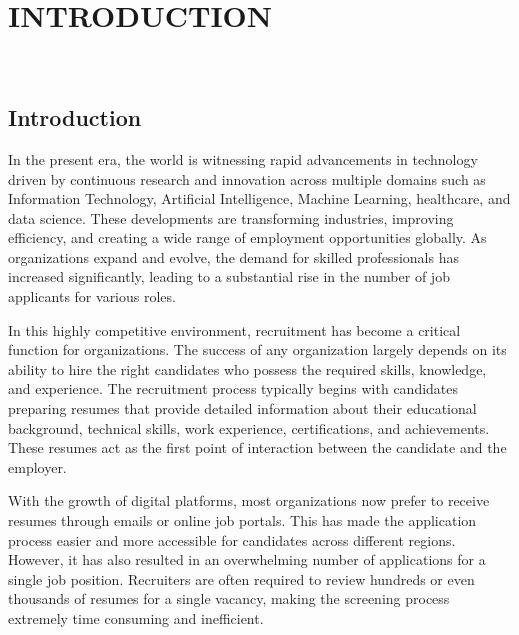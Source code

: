 \chapter{INTRODUCTION}

\patchcmd{\chapter}{\thispagestyle{fancy}}{}{}
 \hrulefill\\

\renewcommand{\thesection}{\thechapter.\arabic{section}}
\doublespacing

\section{Introduction}
{%
In the present era, the world is witnessing rapid advancements in technology driven by continuous research and innovation across multiple domains such as Information Technology, Artificial Intelligence, Machine Learning, healthcare, and data science. These developments are transforming industries, improving efficiency, and creating a wide range of employment opportunities globally. As organizations expand and evolve, the demand for skilled professionals has increased significantly, leading to a substantial rise in the number of job applicants for various roles.}


\vspace{6pt}
{%
In this highly competitive environment, recruitment has become a critical function for organizations. The success of any organization largely depends on its ability to hire the right candidates who possess the required skills, knowledge, and experience. The recruitment process typically begins with candidates preparing resumes that provide detailed information about their educational background, technical skills, work experience, certifications, and achievements. These resumes act as the first point of interaction between the candidate and the employer.}

\vspace{6pt}
{%
With the growth of digital platforms, most organizations now prefer to receive resumes through emails or online job portals. This has made the application process easier and more accessible for candidates across different regions. However, it has also resulted in an overwhelming number of applications for a single job position. Recruiters are often required to review hundreds or even thousands of resumes for a single vacancy, making the screening process extremely time consuming and inefficient.}

